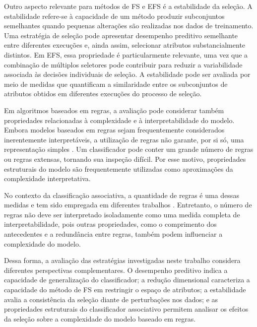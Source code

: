 Outro aspecto relevante para métodos de FS e EFS é a estabilidade da seleção. A estabilidade refere-se à capacidade de um método produzir subconjuntos semelhantes quando pequenas alterações são realizadas nos dados de treinamento. Uma estratégia de seleção pode apresentar desempenho preditivo semelhante entre diferentes execuções e, ainda assim, selecionar atributos substancialmente distintos. Em EFS, essa propriedade é particularmente relevante, uma vez que a combinação de múltiplos seletores pode contribuir para reduzir a variabilidade associada às decisões individuais de seleção. A estabilidade pode ser avaliada por meio de medidas que quantificam a similaridade entre os subconjuntos de atributos obtidos em diferentes execuções do processo de seleção.

Em algoritmos baseados em regras, a avaliação pode considerar também propriedades relacionadas à complexidade e à interpretabilidade do modelo. Embora modelos baseados em regras sejam frequentemente considerados inerentemente interpretáveis, a utilização de regras não garante, por si só, uma representação simples \cite{Rudin2019,margot2021interpretability,molnar2022}. Um classificador pode conter um grande número de regras ou regras extensas, tornando sua inspeção difícil. Por esse motivo, propriedades estruturais do modelo são frequentemente utilizadas como aproximações da complexidade interpretativa.

No contexto da classificação associativa, a quantidade de regras é uma dessas medidas e tem sido empregada em diferentes trabalhos \cite{Agnol:2024,math11183978,momac,app12189055,Building2020,DBLP:journals/access/Rajab19,DBLP:conf/kdd/LakkarajuBL16}. Entretanto, o número de regras não deve ser interpretado isoladamente como uma medida completa de interpretabilidade, pois outras propriedades, como o comprimento dos antecedentes e a redundância entre regras, também podem influenciar a complexidade do modelo.

Dessa forma, a avaliação das estratégias investigadas neste trabalho considera diferentes perspectivas complementares. O desempenho preditivo indica a capacidade de generalização do classificador; a redução dimensional caracteriza a capacidade do método de FS em restringir o espaço de atributos; a estabilidade avalia a consistência da seleção diante de perturbações nos dados; e as propriedades estruturais do classificador associativo permitem analisar os efeitos da seleção sobre a complexidade do modelo baseado em regras.

